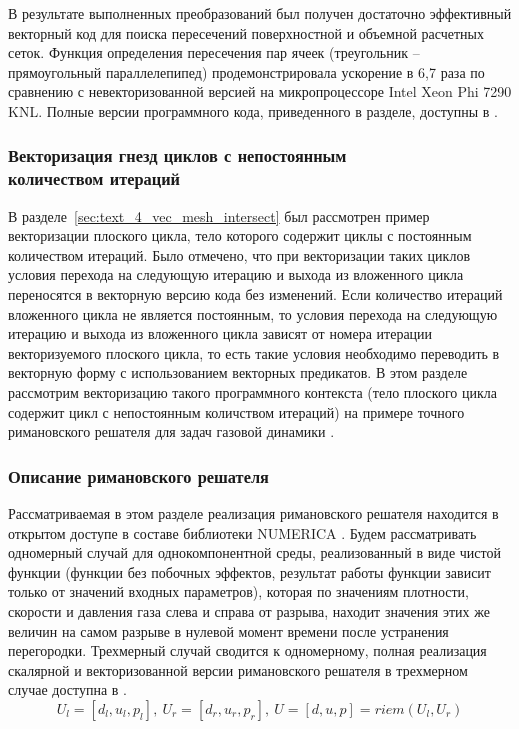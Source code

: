 В результате выполненных преобразований был получен достаточно эффективный векторный код для поиска пересечений поверхностной и объемной расчетных сеток.
Функция определения пересечения пар ячеек (треугольник -- прямоугольный параллелепипед) продемонстрировала ускорение в 6,7 раза по сравнению с невекторизованной версией на микропроцессоре Intel Xeon Phi 7290 KNL\label{abbr:knl12}.
Полные версии программного кода, приведенного в разделе, доступны в \cite{iparGithub}.

\subsubsection{Векторизация гнезд циклов с непостоянным \\ количеством итераций}\label{sec:text_4_vec_riemann}

В разделе~\ref{sec:text_4_vec_mesh_intersect} был рассмотрен пример векторизации плоского цикла, тело которого содержит циклы с постоянным количеством итераций.
Было отмечено, что при векторизации таких циклов условия перехода на следующую итерацию и выхода из вложенного цикла переносятся в векторную версию кода без изменений.
Если количество итераций вложенного цикла не является постоянным, то условия перехода на следующую итерацию и выхода из вложенного цикла зависят от номера итерации векторизуемого плоского цикла, то есть такие условия необходимо переводить в векторную форму с использованием векторных предикатов\label{term:vector_mask7}.
В этом разделе рассмотрим векторизацию\label{term:vectorization4} такого программного контекста (тело плоского цикла содержит цикл с непостоянным количством итераций) на примере точного римановского решателя\label{term:riemann_solver6} для задач газовой динамики \cite{Rybakov2019VecRiem1,Rybakov2019VecRiem2}.

\subsubsection{Описание римановского решателя}

Рассматриваемая в этом разделе реализация римановского решателя находится в открытом доступе в составе библиотеки NUMERICA \cite{numericaGithub}.
Будем рассматривать одномерный случай для однокомпонентной среды, реализованный в виде чистой функции (функции без побочных эффектов, результат работы функции зависит только от значений входных параметров), которая по значениям плотности, скорости и давления газа слева и справа от разрыва, находит значения этих же величин на самом разрыве в нулевой момент времени после устранения перегородки.
Трехмерный случай сводится к одномерному, полная реализация скалярной и векторизованной версии римановского решателя в трехмерном случае доступна в \cite{riemannvecGithub}.
\begin{equation}\label{eqn:text_4_vec_riemann_riemann}
U_l = [d_l, u_l, p_l], \ U_r = [d_r, u_r, p_r], \ U = [d, u, p] = riem(U_l, U_r)
\end{equation}


